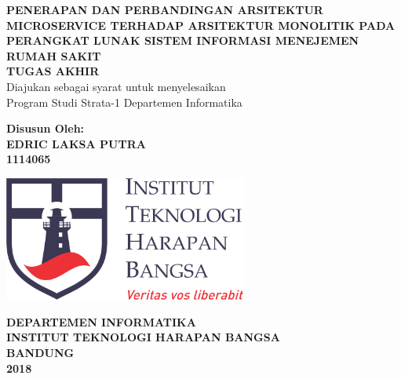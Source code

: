 \begin{titlepage}
\begin{center}
	\onehalfspacing
	{\large \bfseries PENERAPAN DAN PERBANDINGAN ARSITEKTUR MICROSERVICE TERHADAP ARSITEKTUR MONOLITIK PADA PERANGKAT LUNAK SISTEM INFORMASI MENEJEMEN RUMAH SAKIT\\
	\vspace{1.5cm}
	 \large TUGAS AKHIR}\\
           Diajukan sebagai syarat untuk menyelesaikan\\ Program Studi Strata-1 Departemen Informatika

	\vspace{1.5cm}
          {\bfseries Disusun Oleh: \\
           EDRIC LAKSA PUTRA \\
	1114065}
	
	\vspace{1.5cm}
	\includegraphics[width=8cm]{images/ithb.jpg}
	
	
	\vspace{3.5cm}
	
{\large \bfseries DEPARTEMEN INFORMATIKA \\
INSTITUT TEKNOLOGI HARAPAN BANGSA \\
BANDUNG\\
2018}

	
\end{center}

\end{titlepage}

\newpage